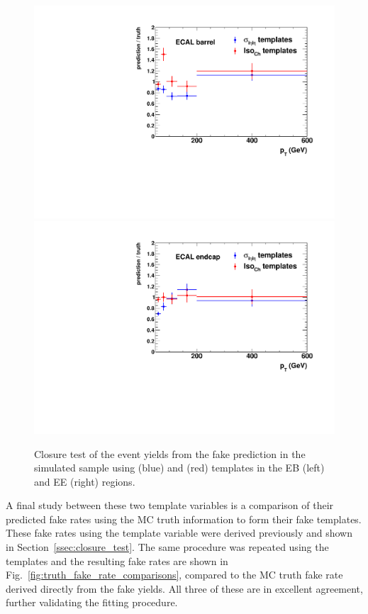 \begin{figure}[!htbp]
  \centering
  \includegraphics[scale=0.40]{figures/closure_test_fake_rate_ratio_comparison_EB.pdf}
  \includegraphics[scale=0.40]{figures/closure_test_fake_rate_ratio_comparison_EE.pdf}
  \caption{Closure test of the event yields from the fake prediction in the simulated sample using \sieie (blue) and \chiso (red) templates in the EB (left) and EE (right) regions.}
  \label{fig:closure_test_yields_comparison}
\end{figure}

A final study between these two template variables is a comparison of their predicted fake rates using the MC truth information to form their fake templates. These fake rates using the \sieie template variable were derived previously and shown in Section~\ref{ssec:closure_test}. The same procedure was repeated using the \chiso templates and the resulting fake rates are shown in Fig.~\ref{fig:truth_fake_rate_comparisons}, compared to the MC truth fake rate derived directly from the fake yields. All three of these are in excellent agreement, further validating the fitting procedure.

